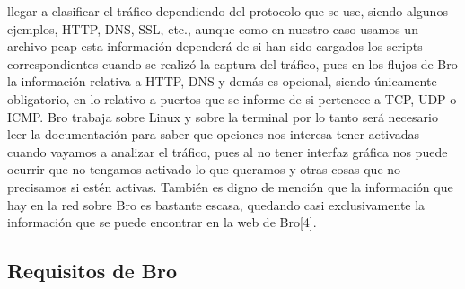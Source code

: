 {{{llegar a clasificar el tráfico dependiendo del protocolo que se use, siendo 
algunos ejemplos, HTTP, DNS, SSL, etc., aunque como en nuestro caso usamos 
un archivo pcap esta información dependerá de si han sido cargados los scripts 
correspondientes cuando se realizó la captura del tráfico, pues en los flujos 
de Bro la información relativa a HTTP, DNS y demás es opcional, siendo únicamente 
obligatorio, en lo relativo a puertos que se informe de si pertenece a TCP, UDP o ICMP.
\intro
Bro trabaja sobre Linux y sobre la terminal por lo tanto será necesario leer 
la documentación para saber que opciones nos interesa tener activadas cuando 
vayamos a analizar el tráfico, pues al no tener interfaz gráfica nos puede 
ocurrir que no tengamos activado lo que queramos y otras cosas que no 
precisamos si estén activas.
\intro
También es digno de mención que la información que hay en la red sobre Bro 
es bastante escasa, quedando casi exclusivamente la información que se puede 
encontrar en la web de Bro[4].

\subsection{Requisitos de Bro}

}}}
